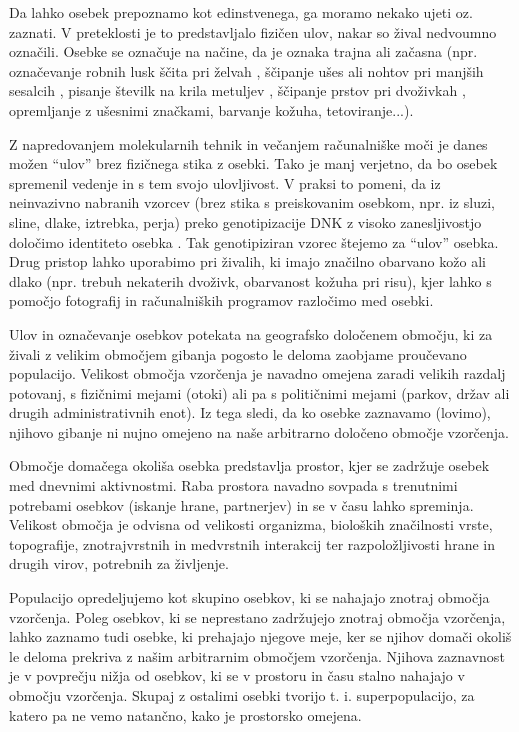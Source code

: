 Da lahko osebek prepoznamo kot edinstvenega, ga moramo nekako ujeti oz. zaznati. V preteklosti je to predstavljalo fizičen ulov, nakar so žival nedvoumno označili. Osebke se označuje na načine, da je oznaka trajna ali začasna (npr. označevanje robnih lusk ščita pri želvah \citep{pike2005}, ščipanje ušes ali nohtov pri manjših sesalcih \citep{wiewel_assessing_2007}, pisanje številk na krila metuljev \citep{jugovic_movement_2017}, ščipanje prstov pri dvoživkah \citep{campbell_evaluation_2009}, opremljanje z ušesnimi značkami, barvanje kožuha, tetoviranje...).

Z napredovanjem molekularnih tehnik in večanjem računalniške moči je danes možen “ulov” brez fizičnega stika z osebki. Tako je manj verjetno, da bo osebek spremenil vedenje in s tem svojo ulovljivost. V praksi to pomeni, da iz neinvazivno nabranih vzorcev (brez stika s preiskovanim osebkom, npr. iz sluzi, sline, dlake, iztrebka, perja) preko genotipizacije DNK z visoko zanesljivostjo določimo identiteto osebka \citep{waits_noninvasive_2005}. Tak genotipiziran vzorec štejemo za “ulov” osebka. Drug pristop lahko uporabimo pri živalih, ki imajo značilno obarvano kožo ali dlako (npr. trebuh nekaterih dvoživk, obarvanost kožuha pri risu), kjer lahko s pomočjo fotografij in računalniških programov razločimo med osebki.

Ulov in označevanje osebkov potekata na geografsko določenem območju, ki za živali z velikim območjem gibanja pogosto le deloma zaobjame proučevano populacijo. Velikost območja vzorčenja je navadno omejena zaradi velikih razdalj potovanj, s fizičnimi mejami (otoki) ali pa s političnimi mejami (parkov, držav ali drugih administrativnih enot). Iz tega sledi, da ko osebke zaznavamo (lovimo), njihovo gibanje ni nujno omejeno na naše arbitrarno določeno območje vzorčenja.

Območje domačega okoliša osebka predstavlja prostor, kjer se zadržuje osebek med dnevnimi aktivnostmi. Raba prostora navadno sovpada s trenutnimi potrebami osebkov (iskanje hrane, partnerjev) in se v času lahko spreminja. Velikost območja je odvisna od velikosti organizma, bioloških značilnosti vrste, topografije, znotrajvrstnih in medvrstnih interakcij ter razpoložljivosti hrane in drugih virov, potrebnih za življenje.

Populacijo opredeljujemo kot skupino osebkov, ki se nahajajo znotraj območja vzorčenja. Poleg osebkov, ki se neprestano zadržujejo znotraj območja vzorčenja, lahko zaznamo tudi osebke, ki prehajajo njegove meje, ker se njihov domači okoliš le deloma prekriva z našim arbitrarnim območjem vzorčenja. Njihova zaznavnost je v povprečju nižja od osebkov, ki se v prostoru in času stalno nahajajo v območju vzorčenja. Skupaj z ostalimi osebki tvorijo t. i. superpopulacijo, za katero pa ne vemo natančno, kako je prostorsko omejena.

